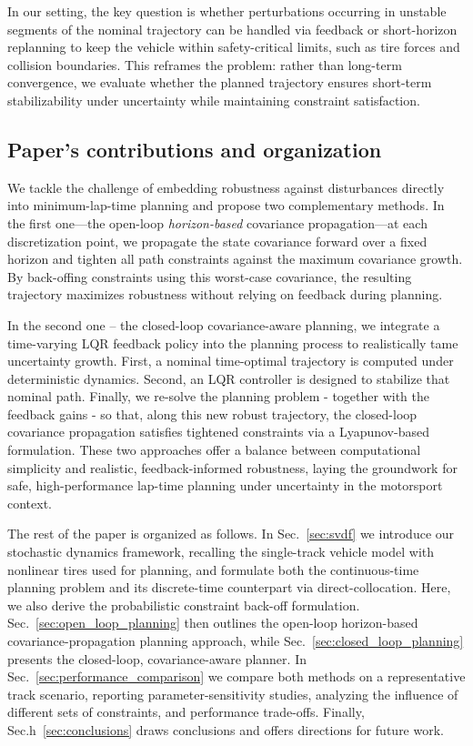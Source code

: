 In our setting, the key question is whether perturbations occurring in unstable segments of the nominal trajectory can be handled via feedback or short-horizon replanning to keep the vehicle within safety-critical limits, such as tire forces and collision boundaries. This reframes the problem: rather than long-term convergence, we evaluate whether the planned trajectory ensures short-term stabilizability under uncertainty while maintaining constraint satisfaction.



\subsection{Paper's contributions and organization}
We tackle the challenge of embedding robustness against disturbances directly into minimum-lap-time planning and propose two complementary methods. In the first one---the open-loop \emph{horizon-based} covariance propagation---at each discretization point, we propagate the state covariance forward over a fixed horizon and tighten all path constraints against the maximum covariance growth. By back-offing constraints using this worst-case covariance, the resulting trajectory maximizes robustness without relying on feedback during planning.

In the second one -- the closed-loop covariance-aware planning, we integrate a time-varying LQR feedback policy into the planning process to realistically tame uncertainty growth. First, a nominal time-optimal trajectory is computed under deterministic dynamics. Second, an LQR controller is designed to stabilize that nominal path. Finally, we re-solve the planning problem - together with the feedback gains - so that, along this new robust trajectory, the closed-loop covariance propagation satisfies tightened constraints via a Lyapunov-based formulation. These two approaches offer a balance between computational simplicity and realistic, feedback-informed robustness, laying the groundwork for safe, high-performance lap-time planning under uncertainty in the motorsport context.

The rest of the paper is organized as follows.
In Sec.~\ref{sec:svdf} we introduce our stochastic dynamics framework, recalling the single-track vehicle model with nonlinear tires used for planning, and formulate both the continuous-time planning problem and its discrete-time counterpart via direct-collocation. Here, we also derive the probabilistic constraint back-off formulation.
Sec.~\ref{sec:open_loop_planning} then outlines the open-loop horizon-based covariance-propagation planning approach, while Sec.~\ref{sec:closed_loop_planning} presents the closed-loop, covariance-aware planner. In Sec.~\ref{sec:performance_comparison} we compare both methods on a representative track scenario, reporting parameter-sensitivity studies, analyzing the influence of different sets of constraints, and performance trade-offs.
Finally, Sec.h~\ref{sec:conclusions} draws conclusions and offers directions for future work.
  